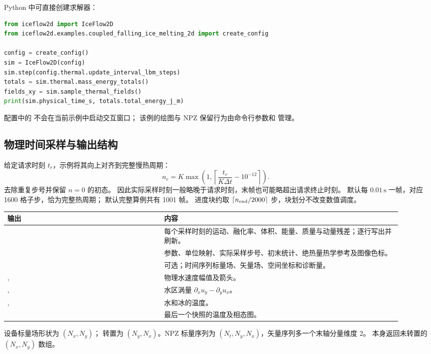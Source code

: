 Python 中可直接创建求解器：
\par\noindent\begin{minipage}{\linewidth}
\begin{lstlisting}[language=Python]
from iceflow2d import IceFlow2D
from iceflow2d.examples.coupled_falling_ice_melting_2d import create_config

config = create_config()
sim = IceFlow2D(config)
sim.step(config.thermal.update_interval_lbm_steps)
totals = sim.thermal.mass_energy_totals()
fields_xy = sim.sample_thermal_fields()
print(sim.physical_time_s, totals.total_energy_j_m)
\end{lstlisting}
\end{minipage}\par
配置中的  不会在当前示例中启动交互窗口；
该例的绘图与 NPZ 保留行为由命令行参数和  管理。

\subsection{物理时间采样与输出结构}
给定请求时刻 $t_r$，示例将其向上对齐到完整慢热周期：
\begin{equation}
 n_r=K\max\left(1,\left\lceil\frac{t_r}{K\Delta t}-10^{-12}\right\rceil\right).
\end{equation}
去除重复步号并保留 $n=0$ 的初态。
因此实际采样时刻一般略晚于请求时刻，末帧也可能略超出请求终止时刻。
默认每 $0.01\,\mathrm s$ 一帧，对应 1600 格子步，恰为完整热周期；
默认完整算例共有 1001 帧。
进度块约取 $\lceil n_{\rm end}/2000\rceil$ 步，块划分不改变数值调度。

\begin{longtable}{L{0.37\linewidth}L{0.56\linewidth}}
\toprule 输出 & 内容\\\midrule
\endhead
{} & 每个采样时刻的运动、融化率、体积、能量、质量与动量残差；逐行写出并刷新。\\
 & 参数、单位映射、实际采样步号、初末统计、绝热量热学参考及图像色标。\\
 & 可选；时间序列标量场、矢量场、空间坐标和诊断量。\\
,  & 物理水速度幅值及箭头。\\
,  & 水区涡量 $\partial_xu_y-\partial_yu_x$。\\
,  & 水和冰的温度。\\
 & 最后一个快照的温度及相态图。\\
\bottomrule
\end{longtable}
设备标量场形状为 $(N_x,N_y)$； 转置为
$(N_y,N_x)$。NPZ 标量序列为 $(N_t,N_y,N_x)$，矢量序列多一个末轴分量维度 2。
 本身返回未转置的 $(N_x,N_y)$ 数组。

